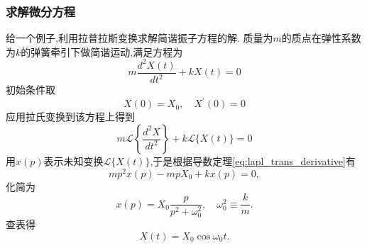 \subsubsection{求解微分方程}
给一个例子,利用拉普拉斯变换求解简谐振子方程的解.
    质量为$m$的质点在弹性系数为$k$的弹簧牵引下做简谐运动,满足方程为
    $$
m \frac{d^2 X(t)}{d t^2}+k X(t)=0
$$
初始条件取
$$
X(0)=X_0, \quad X^{\prime}(0)=0
$$
应用拉氏变换到该方程上得到
$$
m \mathcal{L}\left\{\frac{d^2 X}{d t^2}\right\}+k \mathcal{L}\{X(t)\}=0
$$
用$x(p)$表示未知变换$\mathcal{L}\{ X(t)\}$,于是根据导数定理\eqref{eq:lapl_trans_derivative}有
$$
m p^2 x(p)-m p X_0+k x(p)=0,
$$
化简为
$$
x(p)=X_0 \frac{p}{p^2+\omega_0^2}, \quad \omega_0^2 \equiv \frac{k}{m} .
$$
查表得
$$
X(t)=X_0 \cos \omega_0 t.
$$
